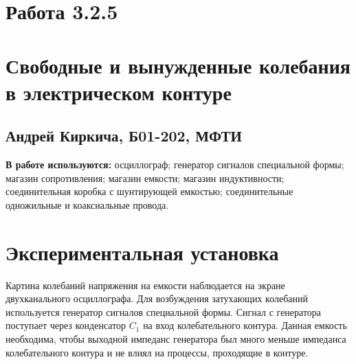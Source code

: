 


\section*{Работа 3.2.5}	
	\section*{Свободные и вынужденные колебания в электрическом контуре}
	\subsection*{Андрей Киркича, Б01-202, МФТИ}
	\n
	\textbf{В работе используются: }
осциллограф; генератор сигналов специальной формы; магазин сопротивления; магазин емкости; магазин индуктивности; соединительная коробка с шунтирующей емкостью; соединительные одножильные и коаксиальные провода.

\section*{Экспериментальная установка}
Картина колебаний напряжения на емкости наблюдается на экране двухканального осциллографа. Для возбуждения затухающих колебаний используется генератор сигналов специальной
формы. Сигнал с генератора поступает через конденсатор $C_1$ на вход колебательного контура. Данная емкость необходима, чтобы выходной импеданс генератора был много меньше импеданса колебательного контура и не влиял на процессы, проходящие в контуре.

